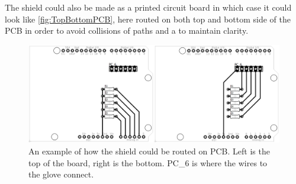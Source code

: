 The shield could also be made as a printed circuit board in which case it could look like \autoref{fig:TopBottomPCB}, here routed on both top and bottom side of the PCB in order to avoid collisions of paths and a to maintain clarity.

\begin{figure}[H]
\centering
\includegraphics[scale=0.15]{Figure/TopBottomPCB.png}
\caption{An example of how the shield could be routed on PCB. Left is the top of the board, right is the bottom. PC\_6 is where the wires to the glove connect.}
\label{fig:TopBottomPCB}
\end{figure}
